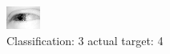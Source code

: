 \begin{figure}[h!]
\begin{center}
\includegraphics[width=0.60\columnwidth]{figures/ID2519_class_3_target_4.png}
\end{center}
\caption{ Classification: 3 actual target: 4}
\label{fig:ID2519_class_3_target_4}
\end{figure}
